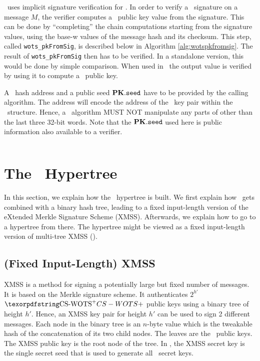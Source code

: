 \SPHINCSA\ uses implicit signature verification for \WOTSCS. In order to verify a \WOTSCS\ signature \sig on a message $M$, the verifier computes a \WOTSCS\ public key value from the signature. This can be done by ``completing'' the chain computations starting from the signature values, using the base-w values of the message hash and its checksum. This step, called \texttt{wots\_pkFromSig}, is described below in Algorithm \ref{alg:wotspkfromsig}. The result of \texttt{wots\_pkFromSig} then has to be verified. In a standalone version, this would be done by simple comparison. When used in \SPHINCSA\ the output value is verified by using it to compute a \SPHINCSA\ public key. 

A \WOTSCS\ hash address \ADRS and a public seed $\mathbf{PK}.\mathtt{seed}$ have to be provided by the calling algorithm. The address will encode the address of the \WOTSCS\ key pair within the \SPHINCSA\ structure. Hence, a \WOTSCS\ algorithm MUST NOT manipulate any parts of \ADRS other than the last three 32-bit words. Note that the $\mathbf{PK}.\mathtt{seed}$ used here is public information also available to a verifier.

\begin{algorithm}
\inputminted[breaklines,linenos,tabsize=2,mathescape,escapeinside=||]{C}{code/wots_pkFromSig.cs}
\caption{\texttt{wots\_pkFromSig} --- Computing a \WOTSCS\ public key from a message and its signature.}
\label{alg:wotspkfromsig}
\end{algorithm}


\section{The \SPHINCSA\ Hypertree}

In this section, we explain how the \SPHINCSA\ hypertree is built. We first explain how \WOTSCS\ gets combined with a binary hash tree, leading to a fixed input-length version of the eXtended Merkle Signature Scheme (XMSS). Afterwards, we explain how to go to a hypertree from there. The hypertree might be viewed as a fixed input-length version of multi-tree XMSS (\XMSSMT).


\subsection{(Fixed Input-Length) XMSS} \label{sec:xmss}

XMSS is a method for signing a potentially large but fixed number of messages. It is based on the Merkle signature scheme. It authenticates $2^{h'}$ $\WOTSCS$ public keys using a binary tree of height $h'$. Hence, an XMSS key pair for height $h'$ can be used to sign 2 different messages. Each node in the binary tree is an $n$-byte value which is the tweakable hash of the concatenation of its two child nodes. The leaves are the \WOTSCS\ public keys. The XMSS public key is the root node of the tree. In \SPHINCSA, the XMSS secret key is the single secret seed that is used to generate all \WOTSCS\ secret keys.

